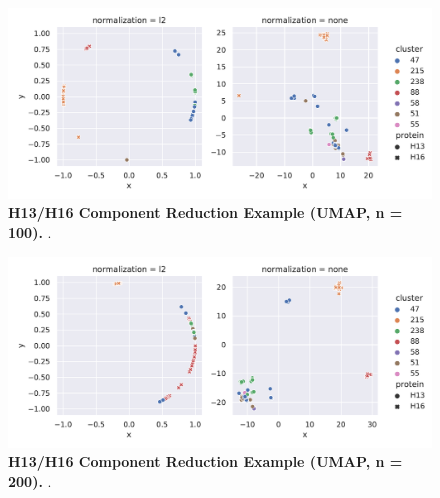 \begin{figure}[!hbt]
    \centering
    \includegraphics[width=\textwidth]{UMAP/Difference_Segment_4_H_UMAP_Neighbors_100.pdf}
    \caption[H13/H16 Component Reduction Example (\Acrshort{UMAP}, n = 100)]{\textbf{H13/H16 Component Reduction Example (\Acrshort{UMAP}, n = 100).} .}
    \label{fig:Reduction_Example_UMAP_100}
\end{figure}

\begin{figure}[!hbt]
    \centering
    \includegraphics[width=\textwidth]{UMAP/Difference_Segment_4_H_UMAP_Neighbors_200.pdf}
    \caption[H13/H16 Component Reduction Example (\Acrshort{UMAP}, n = 200)]{\textbf{H13/H16 Component Reduction Example (\Acrshort{UMAP}, n = 200).} .}   \label{fig:Reduction_Example_UMAP_200}
\end{figure}

